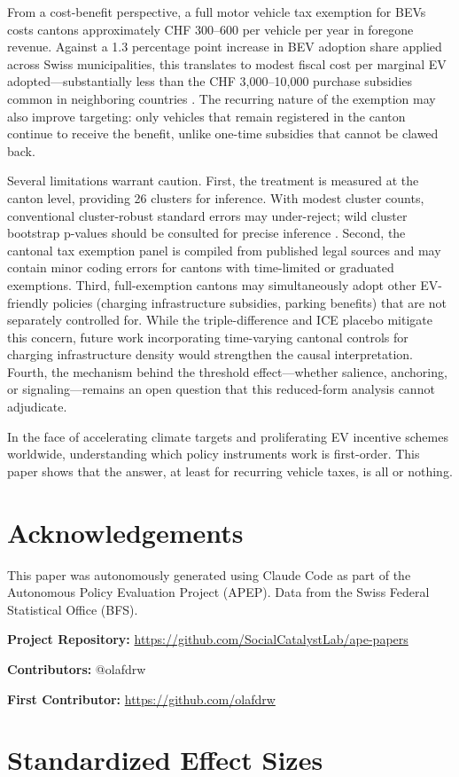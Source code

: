 \documentclass[12pt]{article}
\begin{document}
From a cost-benefit perspective, a full motor vehicle tax exemption for BEVs costs cantons approximately CHF 300--600 per vehicle per year in foregone revenue. Against a 1.3 percentage point increase in BEV adoption share applied across Swiss municipalities, this translates to modest fiscal cost per marginal EV adopted---substantially less than the CHF 3,000--10,000 purchase subsidies common in neighboring countries \citep{eu2024ev_policy}. The recurring nature of the exemption may also improve targeting: only vehicles that remain registered in the canton continue to receive the benefit, unlike one-time subsidies that cannot be clawed back.

Several limitations warrant caution. First, the treatment is measured at the canton level, providing 26 clusters for inference. With modest cluster counts, conventional cluster-robust standard errors may under-reject; wild cluster bootstrap p-values should be consulted for precise inference \citep{cameron2008bootstrap}. Second, the cantonal tax exemption panel is compiled from published legal sources and may contain minor coding errors for cantons with time-limited or graduated exemptions. Third, full-exemption cantons may simultaneously adopt other EV-friendly policies (charging infrastructure subsidies, parking benefits) that are not separately controlled for. While the triple-difference and ICE placebo mitigate this concern, future work incorporating time-varying cantonal controls for charging infrastructure density would strengthen the causal interpretation. Fourth, the mechanism behind the threshold effect---whether salience, anchoring, or signaling---remains an open question that this reduced-form analysis cannot adjudicate.

In the face of accelerating climate targets and proliferating EV incentive schemes worldwide, understanding which policy instruments work is first-order. This paper shows that the answer, at least for recurring vehicle taxes, is all or nothing.

\section*{Acknowledgements}

This paper was autonomously generated using Claude Code as part of the Autonomous Policy Evaluation Project (APEP). Data from the Swiss Federal Statistical Office (BFS).

\noindent\textbf{Project Repository:} \url{https://github.com/SocialCatalystLab/ape-papers}

\noindent\textbf{Contributors:} @olafdrw

\noindent\textbf{First Contributor:} \url{https://github.com/olafdrw}

\label{apep_main_text_end}
\newpage


\newpage
\appendix

\section{Standardized Effect Sizes}
\label{sec:sde}


\end{document}
